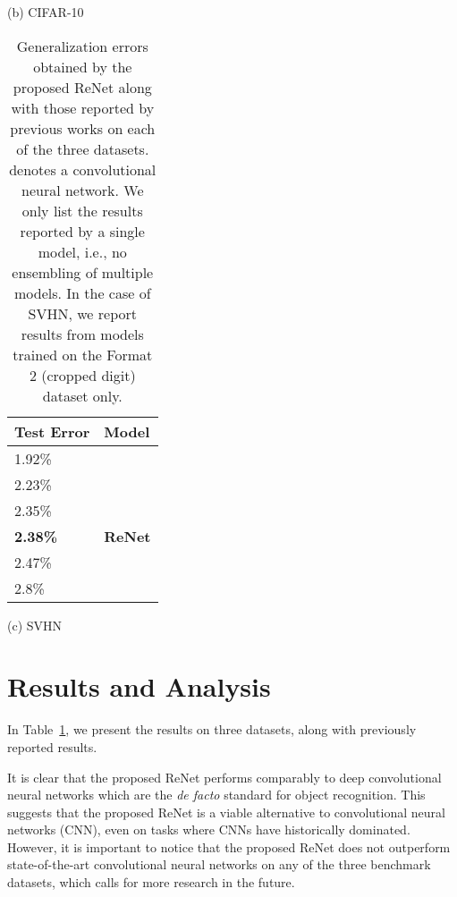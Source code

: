 \documentclass{article} \usepackage{nips15submit_e,times}
\begin{document}
\begin{table}[ht]
\begin{minipage}{0.45\textwidth}
        \vspace{2mm}
        (b) CIFAR-10
    \end{minipage}

    \vspace{4mm}
    \begin{minipage}{0.45\textwidth}
        \centering
        \begin{tabular}{l |  l}
            Test Error & Model  \\
            \hline
1.92\% & \citep{DBLP:journals/corr/LeeXGZT14} \\
2.23\% & \citep{DBLP:conf/icml/WanZZLF13} \\
2.35\% & \citep{Lin2014} \\
\bf{2.38\%} & \bf{ReNet} \\
2.47\% & \citep{Goodfellow2013} \\
2.8\% & \citep{DBLP:journals/corr/abs-1301-3557} \\
        \end{tabular}

        \vspace{2mm}
        (c) SVHN
    \end{minipage}
    \hfill
    \begin{minipage}{0.45\textwidth}
        \caption{Generalization errors obtained by the
            proposed ReNet along with those reported by previous works
            on each of the three datasets.  denotes a
            convolutional neural network. We only list the results reported by a single
            model, i.e., no ensembling of multiple models.
            In the case of SVHN, we report results from models trained on 
            the Format 2 (cropped digit) dataset only.}
        \label{tbl:result}
    \end{minipage}
\end{table}

\section{Results and Analysis}

In Table~\ref{tbl:result}, we present the results on three datasets, 
along with previously reported results. 

It is clear that the proposed ReNet performs comparably to deep convolutional
neural networks which are the {\it de facto} standard for object recognition.
This suggests that the proposed ReNet is a viable alternative to convolutional
neural networks (CNN), even on tasks where CNNs have historically dominated.
However, it is important to notice that the proposed ReNet does not outperform
state-of-the-art convolutional neural networks on any of the three benchmark
datasets, which calls for more research in the future. 
\end{document}
